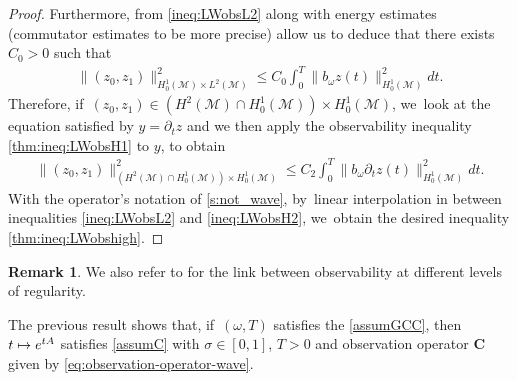 \documentclass[JEP,XML,SOM,Unicode,published]{cedram}
\newcommand\mto{\mathchoice{\longmapsto}{\mapsto}{\mapsto}{\mapsto}}
\theoremstyle{definition}
\newtheorem{remark}[theorem]{Remark}
\let\mc\mathcal
\newcommand{\M}{\mc{M}}
\newcommand{\bC}{\boldsymbol{C}}
\providecommand{\norm}[1]{\lVert#1\rVert}
\begin{document}
\begin{proof}
Furthermore, from \eqref{ineq:LWobsL2} along with energy estimates (commutator estimates to be more precise) allow us to deduce that there exists $C_0>0$ such that\vspace*{-3pt}
\begin{align}\label{thm:ineq:LWobsH1}
\norm{(z_0, z_1)}_{H_0^1(\M)\times L^2(\M)}^2\leq C_0\int_0^T \norm{b_\omega z(t)}_{H_0^1(\M)}^2 dt.
\end{align}
Therefore, if~$(z_0, z_1)\in (H^2(\M)\cap H_0^1(\M))\times H_0^1(\M)$, we~look at the equation satisfied by $y=\partial_t z$ and we then apply the observability inequality \eqref{thm:ineq:LWobsH1} to $y$, to obtain\vspace*{-3pt}
\begin{align}\label{ineq:LWobsH2}
\norm{(z_0, z_1)}_{(H^2(\M)\cap H_0^1(\M))\times H_0^1(\M)}^2\leq C_2\int_0^T \norm{b_\omega \partial_t z(t)}_{H_0^1(\M)}^2dt.
\end{align}
With the operator's notation of \cref{s:not_wave}, by~linear interpolation in between inequalities \eqref{ineq:LWobsL2} and \eqref{ineq:LWobsH2}, we~obtain the desired inequality \eqref{thm:ineq:LWobshigh}.
\end{proof}

\begin{remark}
We also refer to \cite{Per25} for the link between observability at different levels of regularity.
\end{remark}

The previous result shows that, if~$(\omega, T)$ satisfies the \ref{assumGCC}, then $t\mto e^{tA}$ satisfies \cref{assumC} with $\sigma\in [0,1]$, $T>0$ and observation operator $\bC$ given by \eqref{eq:observation-operator-wave}.
\end{document}
